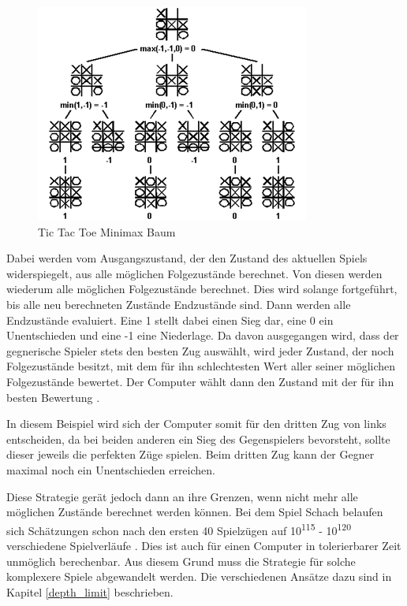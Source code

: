 \begin{figure}[h]
\centering
\includegraphics[width=\textwidth/5*3]{images/tictactoe_minimax_tree.png}

\caption{Tic Tac Toe Minimax Baum \cite{Kurenkov2019}}\label{fig:tictactoe_minimax_tree}
\end{figure}

Dabei werden vom Ausgangszustand, der den Zustand des aktuellen Spiels widerspiegelt, aus alle möglichen Folgezustände berechnet. Von diesen werden wiederum alle möglichen Folgezustände berechnet. Dies wird solange fortgeführt, bis alle neu berechneten Zustände Endzustände sind. Dann werden alle Endzustände evaluiert. Eine 1 stellt dabei einen Sieg dar, eine 0 ein Unentschieden und eine -1 eine Niederlage. Da davon ausgegangen wird, dass der gegnerische Spieler stets den besten Zug auswählt, wird jeder Zustand, der noch Folgezustände besitzt, mit dem für ihn schlechtesten Wert aller seiner möglichen Folgezustände bewertet. Der Computer wählt dann den Zustand mit der für ihn besten Bewertung \cite{Russell2010}.

In diesem Beispiel wird sich der Computer somit für den dritten Zug von links entscheiden, da bei beiden anderen ein Sieg des Gegenspielers bevorsteht, sollte dieser jeweils die perfekten Züge spielen. Beim dritten Zug kann der Gegner maximal noch ein Unentschieden erreichen.

Diese Strategie gerät jedoch dann an ihre Grenzen, wenn nicht mehr alle möglichen Zustände berechnet werden können. Bei dem Spiel Schach belaufen sich Schätzungen schon nach den ersten 40 Spielzügen auf 10\textsuperscript{115} - 10\textsuperscript{120} verschiedene Spielverläufe \cite{Bonsdorff1978}. Dies ist auch für einen Computer in tolerierbarer Zeit unmöglich berechenbar. Aus diesem Grund muss die Strategie für solche komplexere Spiele abgewandelt werden. Die verschiedenen Ansätze dazu sind in Kapitel \ref{depth_limit} beschrieben.

